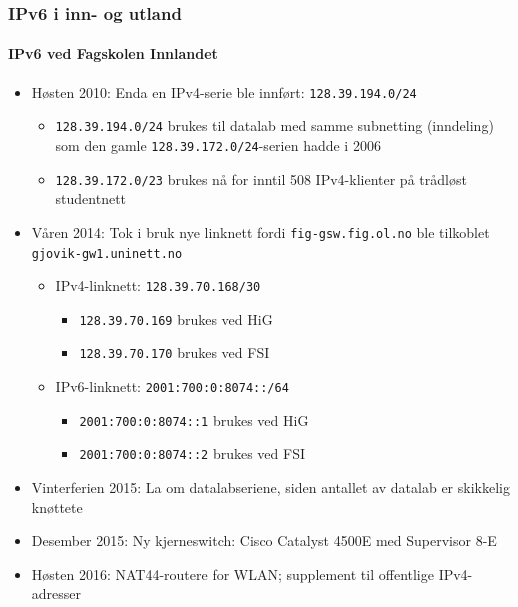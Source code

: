 \begin{frame}%
  \frametitle{IPv6 i inn- og utland}
  \framesubtitle{IPv6 ved Fagskolen Innlandet}
  \begin{itemize}%
  \item Høsten 2010: Enda en IPv4-serie ble innført:
    \texttt{128.39.194.0/24}
    \begin{itemize}%
    \item \texttt{128.39.194.0/24} brukes til datalab med samme
      subnetting (inndeling) som den gamle
      \texttt{128.39.172.0/24}-serien hadde i 2006
    \item \texttt{128.39.172.0/\alert{23}} brukes nå for inntil 508
      IPv4-klienter på trådløst studentnett
    \end{itemize}
  \item Våren 2014: Tok i bruk nye linknett fordi
    \texttt{fig-gsw.fig.ol.no} ble tilkoblet
    \texttt{gjovik-gw1.uninett.no}
    \begin{itemize}%
    \item IPv4-linknett: \texttt{128.39.70.168/30}
      \begin{itemize}%
      \item \texttt{128.39.70.169} brukes ved HiG
      \item \texttt{128.39.70.170} brukes ved FSI
      \end{itemize}
    \item IPv6-linknett: \texttt{2001:700:0:8074::/64}
      \begin{itemize}%
      \item \texttt{2001:700:0:8074::1} brukes ved HiG
      \item \texttt{2001:700:0:8074::2} brukes ved FSI
      \end{itemize}
    \end{itemize}
  \item Vinterferien 2015: La om datalabseriene, siden antallet av datalab
    er skikkelig knøttete
  \item Desember 2015: Ny kjerneswitch: Cisco Catalyst 4500E med Supervisor 8-E
  \item Høsten 2016: NAT44-routere for WLAN; supplement til offentlige
    IPv4-adresser
  \end{itemize}
\end{frame}

